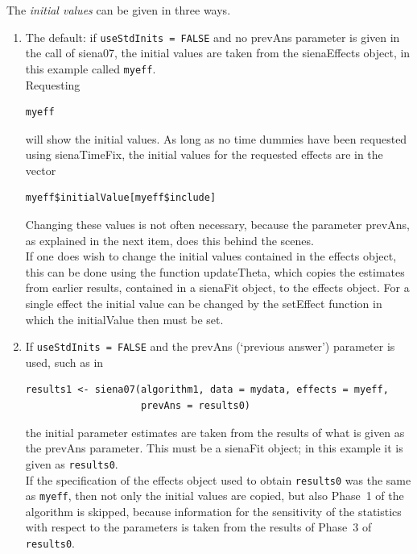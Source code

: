 \documentclass[a4paper,fleqn,11pt]{article}
\newcommand{\+}{\, + \,}
\newcommand{\sfn}[1]{\textsf{#1}}
\begin{document}
The \emph{initial values} can be given in three ways.
\begin{enumerate}
\item The default: if \texttt{useStdInits = FALSE} and no \textsf{prevAns}
      parameter is given in the call of \textsf{siena07},
      the initial values are taken from the \textsf{sienaEffects} object,
      in this example called \texttt{myeff}.\\
      Requesting
\begin{verbatim}
myeff
\end{verbatim}
      will show the initial values.
      As long as no time dummies have been requested
      using \textsf{sienaTimeFix}, the initial values for the requested
      effects are in the vector
\begin{verbatim}
myeff$initialValue[myeff$include]
\end{verbatim}
      Changing these values is not often necessary, because the
      parameter \textsf{prevAns}, as explained in the next item,
      does this behind the scenes.\\
       If one does wish to change the initial values contained in
      the effects object, this can be done using the
      function \textsf{updateTheta}, which copies the
      estimates from earlier results, contained in a
      \sfn{sienaFit} object, to the effects object.
      For a single effect the initial value can be changed
      by the \textsf{setEffect}
      function in which the \textsf{initialValue} then must be set.
\item If \texttt{useStdInits = FALSE} and the \textsf{prevAns}
      (`previous answer')
      parameter is used, such as in
      \begin{verbatim}
results1 <- siena07(algorithm1, data = mydata, effects = myeff,
                    prevAns = results0)
      \end{verbatim}
      the initial parameter estimates are taken from the results of
      what is given as the
      \textsf{prevAns} parameter. This must be a
      \textsf{sienaFit} object; in this example it is given as
      \texttt{results0}.\\
      If the specification of the effects object used to obtain
      \texttt{results0} was the same as \texttt{myeff}, then not only the initial
      values are copied, but also Phase~1 of the algorithm is skipped,
      because information for the sensitivity of the statistics with
      respect to the parameters is taken from the results of Phase~3
      of \texttt{results0}.\\

\end{enumerate}
\end{document}

